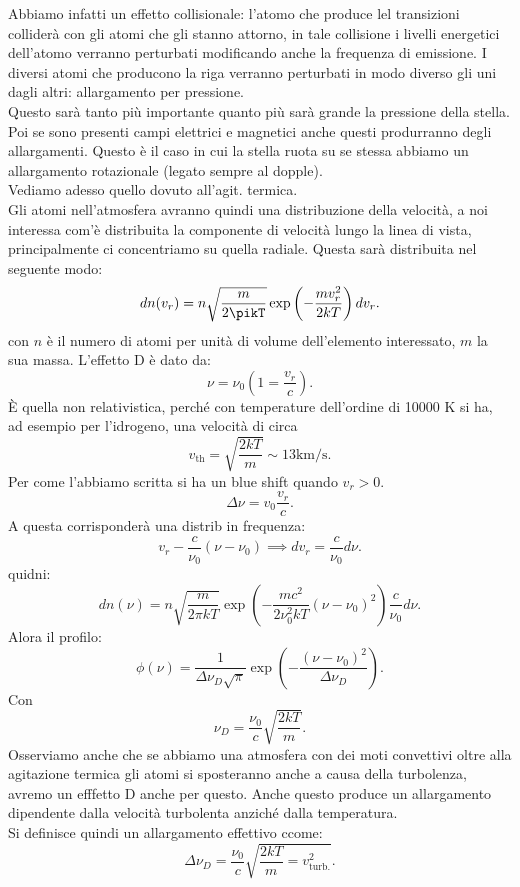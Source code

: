 Abbiamo infatti un effetto collisionale: l'atomo che produce lel transizioni colliderà con gli atomi che gli stanno attorno, in tale collisione i livelli energetici dell'atomo verranno perturbati modificando anche la frequenza di emissione. I diversi atomi che producono la riga verranno perturbati in modo diverso gli uni dagli altri: allargamento per pressione.\\
Questo sarà tanto più importante quanto più sarà grande la pressione della stella. \\
Poi se sono presenti campi elettrici e magnetici anche questi produrranno degli allargamenti. Questo è il caso in cui la stella ruota su se stessa abbiamo un allargamento rotazionale (legato sempre al dopple).\\
Vediamo adesso quello dovuto all'agit. termica.\\
Gli atomi nell'atmosfera avranno quindi una distribuzione della velocità, a noi interessa com'è distribuita la componente di velocità lungo la linea di vista, principalmente ci concentriamo su quella radiale. Questa sarà distribuita nel seguente modo:
\[
	dn( v_{r}) = n\sqrt{\frac{m}{2\pikT}} \exp\left( -\frac{m v_{r}^2}{2kT} \right) dv_r
.\] 
con $n$ è il numero di atomi per unità di volume dell'elemento interessato, $m$ la sua massa. L'effetto D è dato da:
\[
	\nu = \nu_0\left( 1 = \frac{v_r}{c} \right) 
.\] 
È quella non relativistica, perché con temperature dell'ordine di 10000 K si ha, ad esempio per l'idrogeno, una velocità di circa 
\[
	v_{\text{th}}= \sqrt{\frac{2kT}{m}} \sim 13 \text{km}/\text{s}
.\] 
Per come l'abbiamo scritta si ha un blue shift quando $v_r > 0$. 
\[
	\Delta \nu = v_0 \frac{v_r}{c}
.\] 
A questa corrisponderà una distrib in frequenza:
\[
	v_r - \frac{c}{\nu_0}\left( \nu - \nu_0  \right) \implies
	dv_r = \frac{c}{\nu_0}d\nu 
.\] 
quidni:
\[
	dn(\nu ) = n \sqrt{\frac{m}{2\pi kT}} \exp\left( - \frac{mc^2}{2\nu_0^2kT}\left( \nu -\nu_0 \right) ^2 \right) \frac{c}{\nu_0}d\nu 
.\] 
Alora il profilo:
\[
	\phi ( \nu ) = \frac{1}{\Delta \nu_D\sqrt{\pi} }\exp\left( -\frac{\left( \nu -\nu_0 \right) ^2}{\Delta \nu_D} \right) 
.\] 
Con 
\[
	\nu_D = \frac{\nu_0}{c}\sqrt{\frac{2kT}{m}} 
.\] 
Osserviamo anche che se abbiamo una atmosfera con dei moti convettivi oltre alla agitazione termica gli atomi si sposteranno anche a causa della turbolenza, avremo un efffetto D anche per questo. Anche questo produce un allargamento dipendente dalla velocità turbolenta anziché dalla temperatura.\\
Si definisce quindi un allargamento effettivo ccome:
\[
	\Delta \nu_D = \frac{\nu_0}{c}\sqrt{\frac{2kT}{m} = v_\text{turb.}^2} 
.\] 
